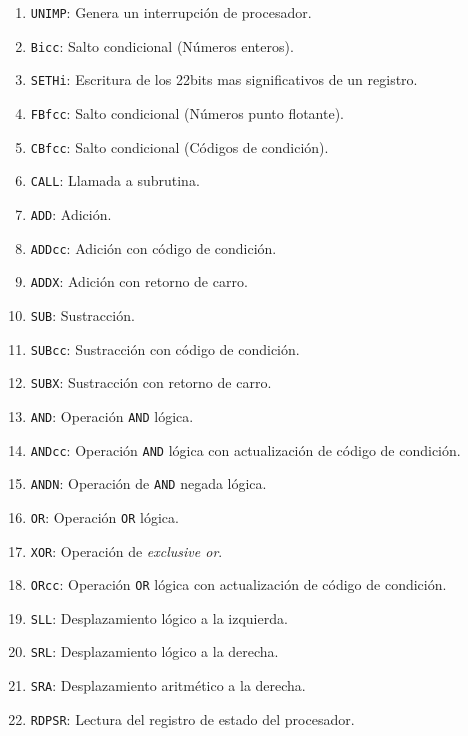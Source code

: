 \begin{enumerate}

\item \texttt{UNIMP}: Genera un interrupción de procesador.
\item \texttt{Bicc}: Salto condicional (Números enteros).
\item \texttt{SETHi}: Escritura de los 22bits mas significativos de un registro.
\item \texttt{FBfcc}: Salto condicional (Números punto flotante).
\item \texttt{CBfcc}: Salto condicional (Códigos de condición).

\item \texttt{CALL}: Llamada a subrutina.

\item \texttt{ADD}: Adición.
\item \texttt{ADDcc}: Adición con código de condición.
\item \texttt{ADDX}: Adición con retorno de carro.

\item \texttt{SUB}: Sustracción.
\item \texttt{SUBcc}: Sustracción con código de condición.
\item \texttt{SUBX}: Sustracción con retorno de carro.

\item \texttt{AND}: Operación \texttt{AND} lógica.
\item \texttt{ANDcc}: Operación \texttt{AND} lógica con actualización de código de condición.
\item \texttt{ANDN}: Operación de \texttt{AND} negada lógica.

\item \texttt{OR}: Operación \texttt{OR} lógica.
\item \texttt{XOR}: Operación de \textit{exclusive or}.
\item \texttt{ORcc}: Operación \texttt{OR} lógica con actualización de código de condición.

\item \texttt{SLL}: Desplazamiento lógico a la izquierda.
\item \texttt{SRL}: Desplazamiento lógico a la derecha.
\item \texttt{SRA}: Desplazamiento aritmético a la derecha.

\item \texttt{RDPSR}: Lectura del registro de estado del procesador.


\end{enumerate}
